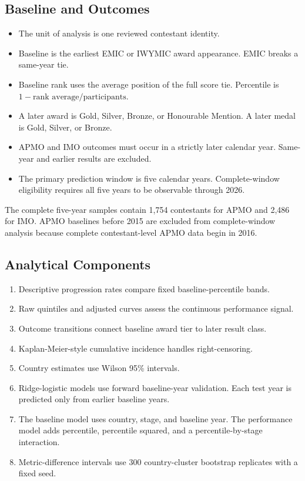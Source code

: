 \documentclass[11pt]{article}
\begin{document}
\subsection{Baseline and Outcomes}
\begin{itemize}
\item The unit of analysis is one reviewed contestant identity.
\item Baseline is the earliest EMIC or IWYMIC award appearance. EMIC breaks a same-year tie.
\item Baseline rank uses the average position of the full score tie. Percentile is $1 - \text{rank average}/\text{participants}$.
\item A later award is Gold, Silver, Bronze, or Honourable Mention. A later medal is Gold, Silver, or Bronze.
\item APMO and IMO outcomes must occur in a strictly later calendar year. Same-year and earlier results are excluded.
\item The primary prediction window is five calendar years. Complete-window eligibility requires all five years to be observable through 2026.
\end{itemize}

The complete five-year samples contain 1,754 contestants for APMO and 2,486 for IMO. APMO baselines before 2015 are excluded from complete-window analysis because complete contestant-level APMO data begin in 2016.

\subsection{Analytical Components}
\begin{enumerate}
\item Descriptive progression rates compare fixed baseline-percentile bands.
\item Raw quintiles and adjusted curves assess the continuous performance signal.
\item Outcome transitions connect baseline award tier to later result class.
\item Kaplan-Meier-style cumulative incidence handles right-censoring.
\item Country estimates use Wilson 95\% intervals.
\item Ridge-logistic models use forward baseline-year validation. Each test year is predicted only from earlier baseline years.
\item The baseline model uses country, stage, and baseline year. The performance model adds percentile, percentile squared, and a percentile-by-stage interaction.
\item Metric-difference intervals use 300 country-cluster bootstrap replicates with a fixed seed.
\end{enumerate}
\end{document}
